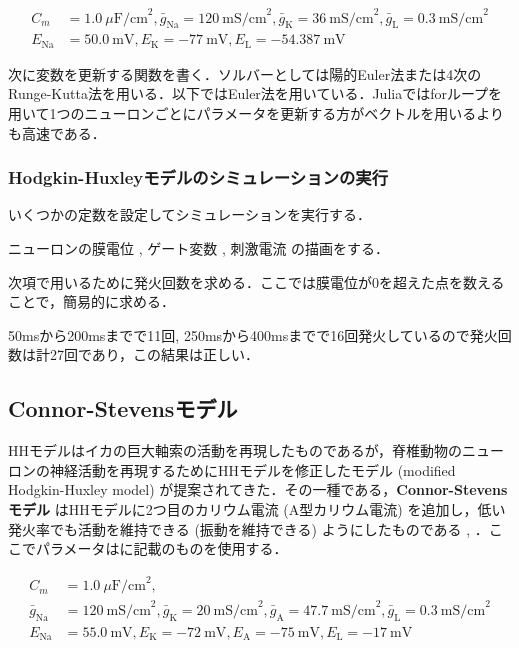 \begin{align}
C_m&=1.0\ \mu\textrm{F/cm}^2, \bar{g}_{\text{Na}}=120\ \textrm{mS/cm}^2, \bar{g}_{\text{K}}=36\ \textrm{mS/cm}^2, \bar{g}_{\text{L}}=0.3\ \textrm{mS/cm}^2\\
E_{\text{Na}}&=50.0\ \textrm{mV}, E_{\text{K}}=-77\ \textrm{mV}, E_{\text{L}}=-54.387\ \textrm{mV} 
\end{align}



次に変数を更新する関数を書く．ソルバーとしては陽的Euler法または4次のRunge-Kutta法を用いる．以下ではEuler法を用いている．Juliaではforループを用いて1つのニューロンごとにパラメータを更新する方がベクトルを用いるよりも高速である．
\subsubsection{Hodgkin-Huxleyモデルのシミュレーションの実行}
いくつかの定数を設定してシミュレーションを実行する．

ニューロンの膜電位 , ゲート変数 , 刺激電流 の描画をする．


次項で用いるために発火回数を求める．ここでは膜電位が0を超えた点を数えることで，簡易的に求める．

50msから200msまでで11回, 250msから400msまでで16回発火しているので発火回数は計27回であり，この結果は正しい．
\subsection{Connor-Stevensモデル}
HHモデルはイカの巨大軸索の活動を再現したものであるが，脊椎動物のニューロンの神経活動を再現するためにHHモデルを修正したモデル (modified Hodgkin-Huxley model) が提案されてきた．その一種である，\textbf{Connor-Stevensモデル} はHHモデルに2つ目のカリウム電流 (A型カリウム電流) を追加し，低い発火率でも活動を維持できる (振動を維持できる) ようにしたものである \cite{Connor1977-qo}, \cite{Connor1971-rs}．ここでパラメータは\cite{Dayan2005-ib}に記載のものを使用する．


\begin{align}
C_m&=1.0\ \mu\textrm{F/cm}^2,\\ 
\bar{g}_{\text{Na}}&=120\ \textrm{mS/cm}^2, \bar{g}_{\text{K}}=20\ \textrm{mS/cm}^2, \bar{g}_{\text{A}}=47.7\ \textrm{mS/cm}^2, \bar{g}_{\text{L}}=0.3\ \textrm{mS/cm}^2\\
E_{\text{Na}}&=55.0\ \textrm{mV}, E_{\text{K}}=-72\ \textrm{mV}, E_{\text{A}}=-75\ \textrm{mV},E_{\text{L}}=-17\ \textrm{mV} 
\end{align}



